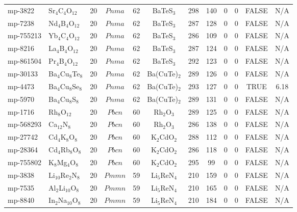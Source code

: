 {\begin{longtable}{llcccccccccc}
    mp-3822 & Sr$_{4}$C$_{4}$O$_{12}$ & 20    & $Pnma$ & 62    & BaTeS$_{3}$ & 298   & 140   & 0     & 0     & FALSE & N/A \\
    mp-7238 & Nd$_{4}$B$_{4}$O$_{12}$ & 20    & $Pnma$ & 62    & BaTeS$_{3}$ & 287   & 128   & 0     & 0     & FALSE & N/A \\
    mp-755213 & Yb$_{4}$C$_{4}$O$_{12}$ & 20    & $Pnma$ & 62    & BaTeS$_{3}$ & 286   & 109   & 0     & 0     & FALSE & N/A \\
    mp-8216 & La$_{4}$B$_{4}$O$_{12}$ & 20    & $Pnma$ & 62    & BaTeS$_{3}$ & 287   & 124   & 0     & 0     & FALSE & N/A \\
    mp-861504 & Pr$_{4}$B$_{4}$O$_{12}$ & 20    & $Pnma$ & 62    & BaTeS$_{3}$ & 292   & 123   & 0     & 0     & FALSE & N/A \\
    mp-30133 & Ba$_{4}$Cu$_{8}$Te$_{8}$ & 20    & $Pnma$ & 62    & Ba(CuTe)$_{2}$ & 289   & 126   & 0     & 0     & FALSE & N/A \\
    mp-4473 & Ba$_{4}$Cu$_{8}$Se$_{8}$ & 20    & $Pnma$ & 62    & Ba(CuTe)$_{2}$ & 293   & 127   & 0     & 0     & TRUE  & 6.18  \\
    mp-5970 & Ba$_{4}$Cu$_{8}$S$_{8}$ & 20    & $Pnma$ & 62    & Ba(CuTe)$_{2}$ & 289   & 131   & 0     & 0     & FALSE & N/A \\
    mp-1716 & Rh$_{8}$O$_{12}$ & 20    & $Pbcn$ & 60    & Rh$_{2}$O$_{3}$ & 289   & 125   & 0     & 0     & FALSE & N/A \\
    mp-568293 & Ca$_{12}$N$_{8}$ & 20    & $Pbcn$ & 60    & Rh$_{2}$O$_{3}$ & 286   & 138   & 0     & 0     & FALSE & N/A \\
    mp-27742 & Cd$_{4}$K$_{8}$O$_{8}$ & 20    & $Pbcn$ & 60    & K$_{2}$CdO$_{2}$ & 288   & 112   & 0     & 0     & FALSE & N/A \\
    mp-28364 & Cd$_{4}$Rb$_{8}$O$_{8}$ & 20    & $Pbcn$ & 60    & K$_{2}$CdO$_{2}$ & 286   & 118   & 0     & 0     & FALSE & N/A \\
    mp-755802 & K$_{8}$Mg$_{4}$O$_{8}$ & 20    & $Pbcn$ & 60    & K$_{2}$CdO$_{2}$ & 295   & 99    & 0     & 0     & FALSE & N/A \\
    mp-3838 & Li$_{10}$Re$_{2}$N$_{8}$ & 20    & $Pmmn$ & 59    & Li$_{5}$ReN$_{4}$ & 210   & 159   & 0     & 0     & FALSE & N/A \\
    mp-7535 & Al$_{2}$Li$_{10}$O$_{8}$ & 20    & $Pmmn$ & 59    & Li$_{5}$ReN$_{4}$ & 210   & 165   & 0     & 0     & FALSE & N/A \\
    mp-8840 & In$_{2}$Na$_{10}$O$_{8}$ & 20    & $Pmmn$ & 59    & Li$_{5}$ReN$_{4}$ & 210   & 184   & 0     & 0     & FALSE & N/A \\

\end{longtable}}
